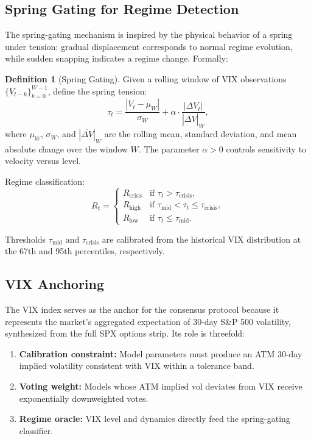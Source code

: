 \documentclass[11pt,a4paper]{article}
\theoremstyle{plain}
\theoremstyle{definition}
\newtheorem{definition}[theorem]{Definition}
\theoremstyle{remark}
\begin{document}
\subsection{Spring Gating for Regime Detection}

The spring-gating mechanism is inspired by the physical behavior of a spring under tension: gradual displacement corresponds to normal regime evolution, while sudden snapping indicates a regime change. Formally:

\begin{definition}[Spring Gating]\label{def:spring_gate}
Given a rolling window of VIX observations $\{V_{t-k}\}_{k=0}^{W-1}$, define the spring tension:
\begin{equation}\label{eq:spring_tension}
  \tau_t = \frac{|V_t - \mu_W|}{\sigma_W} + \alpha \cdot \frac{|\Delta V_t|}{|\overline{\Delta V}|_W},
\end{equation}
where $\mu_W$, $\sigma_W$, and $|\overline{\Delta V}|_W$ are the rolling mean, standard deviation, and mean absolute change over the window $W$. The parameter $\alpha > 0$ controls sensitivity to velocity versus level.

Regime classification:
\begin{equation}\label{eq:spring_classify}
  R_t = \begin{cases}
    R_{\text{crisis}} & \text{if } \tau_t > \tau_{\text{crisis}},\\
    R_{\text{high}}   & \text{if } \tau_{\text{mid}} < \tau_t \leq \tau_{\text{crisis}},\\
    R_{\text{low}}    & \text{if } \tau_t \leq \tau_{\text{mid}}.
  \end{cases}
\end{equation}

Thresholds $\tau_{\text{mid}}$ and $\tau_{\text{crisis}}$ are calibrated from the historical VIX distribution at the 67th and 95th percentiles, respectively.
\end{definition}

\subsection{VIX Anchoring}

The VIX index serves as the anchor for the consensus protocol because it represents the market's aggregated expectation of 30-day S\&P 500 volatility, synthesized from the full SPX options strip. Its role is threefold:

\begin{enumerate}[label=(\roman*), nosep]
  \item \textbf{Calibration constraint:} Model parameters must produce an ATM 30-day implied volatility consistent with VIX within a tolerance band.
  \item \textbf{Voting weight:} Models whose ATM implied vol deviates from VIX receive exponentially downweighted votes.
  \item \textbf{Regime oracle:} VIX level and dynamics directly feed the spring-gating classifier.
\end{enumerate}
\end{document}
